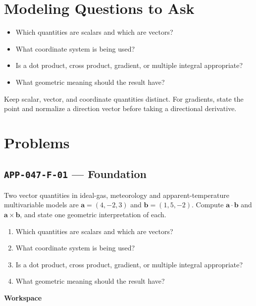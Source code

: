 \documentclass[11pt]{book}
\newcommand{\pid}[1]{\texttt{#1}}
\newcommand{\workspace}{\par\vspace{0.7in}\hrulefill\par\vspace{0.55in}\hrulefill\par}
\begin{document}
\section*{Modeling Questions to Ask}\begin{itemize}
\item Which quantities are scalars and which are vectors?
\item What coordinate system is being used?
\item Is a dot product, cross product, gradient, or multiple integral appropriate?
\item What geometric meaning should the result have?
\end{itemize}
\begin{errorbox}Keep scalar, vector, and coordinate quantities distinct. For gradients, state the point and normalize a direction vector before taking a directional derivative.\end{errorbox}
\section*{Problems}
\subsection*{\pid{APP-047-F-01} — Foundation}
\begin{problembox}
Two vector quantities in ideal-gas, meteorology and apparent-temperature multivariable models are $\mathbf a=(4,-2,3)$ and $\mathbf b=(1,5,-2)$. Compute $\mathbf a\cdot\mathbf b$ and $\mathbf a\times\mathbf b$, and state one geometric interpretation of each.
\end{problembox}
\begin{promptbox}\begin{enumerate}
\item Which quantities are scalars and which are vectors?
\item What coordinate system is being used?
\item Is a dot product, cross product, gradient, or multiple integral appropriate?
\item What geometric meaning should the result have?
\end{enumerate}\end{promptbox}
\textbf{Workspace}\workspace
{}
\end{document}
